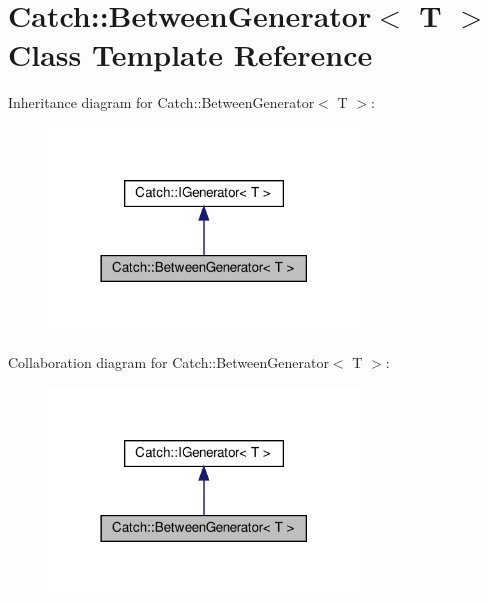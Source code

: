 \hypertarget{classCatch_1_1BetweenGenerator}{}\section{Catch\+:\+:Between\+Generator$<$ T $>$ Class Template Reference}
\label{classCatch_1_1BetweenGenerator}


Inheritance diagram for Catch\+:\+:Between\+Generator$<$ T $>$\+:
\nopagebreak
\begin{figure}[H]
\begin{center}
\leavevmode
\includegraphics[width=234pt]{classCatch_1_1BetweenGenerator__inherit__graph}
\end{center}
\end{figure}


Collaboration diagram for Catch\+:\+:Between\+Generator$<$ T $>$\+:
\nopagebreak
\begin{figure}[H]
\begin{center}
\leavevmode
\includegraphics[width=234pt]{classCatch_1_1BetweenGenerator__coll__graph}
\end{center}
\end{figure}

